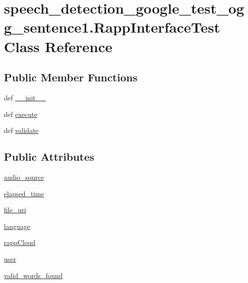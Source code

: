 \hypertarget{classspeech__detection__google__test__ogg__sentence1_1_1RappInterfaceTest}{\section{speech\-\_\-detection\-\_\-google\-\_\-test\-\_\-ogg\-\_\-sentence1.\-Rapp\-Interface\-Test Class Reference}
\label{classspeech__detection__google__test__ogg__sentence1_1_1RappInterfaceTest}
}
\subsection*{Public Member Functions}
\begin{DoxyCompactItemize}
\item 
def \hyperlink{classspeech__detection__google__test__ogg__sentence1_1_1RappInterfaceTest_a758937589c8cbf3e887ee9ee0636cae2}{\-\_\-\-\_\-init\-\_\-\-\_\-}
\item 
def \hyperlink{classspeech__detection__google__test__ogg__sentence1_1_1RappInterfaceTest_a7bb8030a0fe490674f7c70a4834ffda9}{execute}
\item 
def \hyperlink{classspeech__detection__google__test__ogg__sentence1_1_1RappInterfaceTest_a94fba7220f2686c27a0c19cbd6936d09}{validate}
\end{DoxyCompactItemize}
\subsection*{Public Attributes}
\begin{DoxyCompactItemize}
\item 
\hyperlink{classspeech__detection__google__test__ogg__sentence1_1_1RappInterfaceTest_a1ba58edf049acb0f18fb30c36050fb55}{audio\-\_\-source}
\item 
\hyperlink{classspeech__detection__google__test__ogg__sentence1_1_1RappInterfaceTest_af628848b1e7876785f3a2da912f02d03}{elapsed\-\_\-time}
\item 
\hyperlink{classspeech__detection__google__test__ogg__sentence1_1_1RappInterfaceTest_aba0935dd3c67e334957499a8ade4e3c1}{file\-\_\-uri}
\item 
\hyperlink{classspeech__detection__google__test__ogg__sentence1_1_1RappInterfaceTest_a6b521f3c144eb3f1fd8740c244e118be}{language}
\item 
\hyperlink{classspeech__detection__google__test__ogg__sentence1_1_1RappInterfaceTest_a617d29e2fd3728e3404c856febd066cc}{rapp\-Cloud}
\item 
\hyperlink{classspeech__detection__google__test__ogg__sentence1_1_1RappInterfaceTest_a33cc639922372e67aa231b5eee839628}{user}
\item 
\hyperlink{classspeech__detection__google__test__ogg__sentence1_1_1RappInterfaceTest_a80cf34ee5ca87e0a682797fad92089a7}{valid\-\_\-words\-\_\-found}
\end{DoxyCompactItemize}


